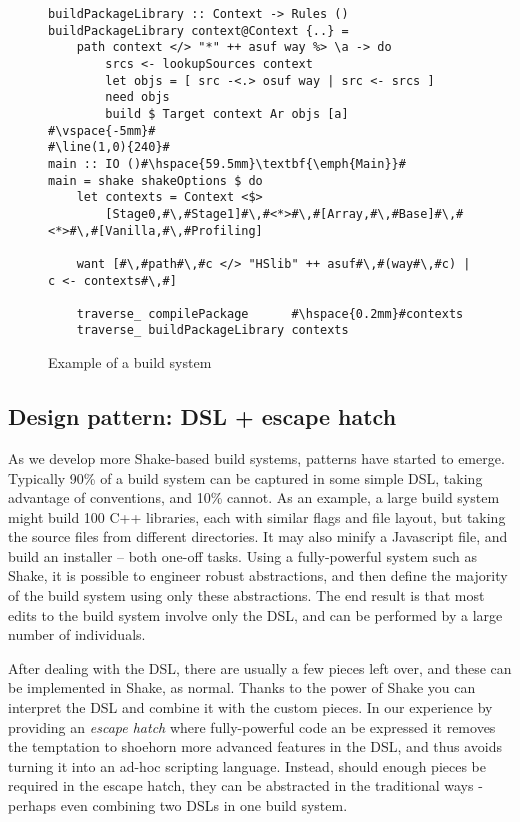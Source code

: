 \begin{figure}
\begin{lstlisting}
buildPackageLibrary :: Context -> Rules ()
buildPackageLibrary context@Context {..} = 
    path context </> "*" ++ asuf way %> \a -> do
        srcs <- lookupSources context
        let objs = [ src -<.> osuf way | src <- srcs ]
        need objs
        build $ Target context Ar objs [a]
#\vspace{-5mm}#
#\line(1,0){240}#
main :: IO ()#\hspace{59.5mm}\textbf{\emph{Main}}#
main = shake shakeOptions $ do
    let contexts = Context <$> 
        [Stage0,#\,#Stage1]#\,#<*>#\,#[Array,#\,#Base]#\,#<*>#\,#[Vanilla,#\,#Profiling]
  
    want [#\,#path#\,#c </> "HSlib" ++ asuf#\,#(way#\,#c) | c <- contexts#\,#]

    traverse_ compilePackage      #\hspace{0.2mm}#contexts
    traverse_ buildPackageLibrary contexts
\end{lstlisting}
\caption{Example of a build system\label{fig:example-abstractions}}
\end{figure}


\subsection{Design pattern: DSL + escape hatch}

As we develop more Shake-based build systems, patterns have started to emerge. Typically 90\% of a build system can be captured in some simple DSL, taking advantage of conventions, and 10\% cannot. As an example, a large build system might build 100 C++ libraries, each with similar flags and file layout, but taking the source files from different directories. It may also minify a Javascript file, and build an installer -- both one-off tasks. Using a fully-powerful system such as Shake, it is possible to engineer robust abstractions, and then define the majority of the build system using only these abstractions. The end result is that most edits to the build system involve only the DSL, and can be performed by a large number of individuals.

After dealing with the DSL, there are usually a few pieces left over, and these can be implemented in Shake, as normal. Thanks to the power of Shake you can interpret the DSL and combine it with the custom pieces. In our experience by providing an \textit{escape hatch} where fully-powerful code an be expressed it removes the temptation to shoehorn more advanced features in the DSL, and thus avoids turning it into an ad-hoc scripting language. Instead, should enough pieces be required in the escape hatch, they can be abstracted in the traditional ways - perhaps even combining two DSLs in one build system.

